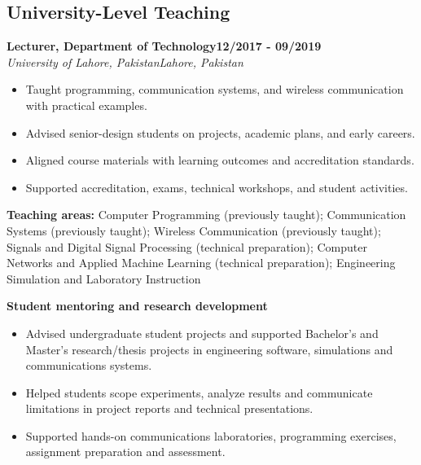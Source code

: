 \documentclass[9pt,letterpaper]{extarticle}
\newcommand{\role}[4]{%
  \Needspace{4\baselineskip}\textbf{#1}\hfill\textbf{#2}\\[-1pt]
  \textit{#3}\hfill\textit{#4}\par}
\begin{document}
\subsection{University-Level Teaching}
\role{Lecturer, Department of Technology}{12/2017 - 09/2019}{University of Lahore, Pakistan}{Lahore, Pakistan}
\begin{itemize}
\item Taught programming, communication systems, and wireless communication with practical examples.
\item Advised senior-design students on projects, academic plans, and early careers.
\item Aligned course materials with learning outcomes and accreditation standards.
\item Supported accreditation, exams, technical workshops, and student activities.
\end{itemize}
\vspace{1pt}
{\small\textbf{Teaching areas:} Computer Programming (previously taught); Communication Systems (previously taught); Wireless Communication (previously taught); Signals and Digital Signal Processing (technical preparation); Computer Networks and Applied Machine Learning (technical preparation); Engineering Simulation and Laboratory Instruction}\par
{}\noindent\textbf{Student mentoring and research development}\par
\begin{itemize}
\item Advised undergraduate student projects and supported Bachelor's and Master's research/thesis projects in engineering software, simulations and communications systems.
\item Helped students scope experiments, analyze results and communicate limitations in project reports and technical presentations.
\item Supported hands-on communications laboratories, programming exercises, assignment preparation and assessment.
\end{itemize}
\end{document}
